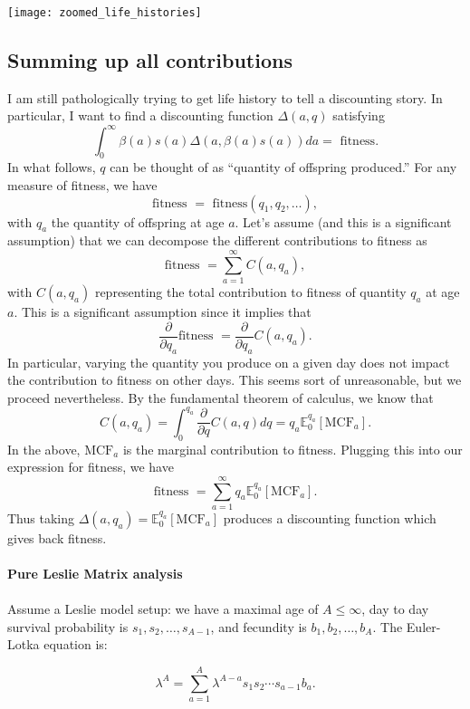 \texttt{[image: zoomed\_life\_histories]} \\

\subsection{Summing up all contributions}
I am still pathologically trying to get life history to tell a discounting story. In particular, I want to find a 
discounting function $\Delta(a,q)$ satisfying
$$ \int_0^\infty \beta(a) s(a) \Delta(a, \beta(a) s(a)) d a = \text{ fitness.} $$
In what follows, $q$ can be thought of as ``quantity of offspring produced.'' For any measure of fitness, we have
$$ \text{fitness } = \text{ fitness}(q_{1}, q_{2}, \ldots ),$$
with $q_a$ the quantity of offspring at age $a$. Let's assume (and this is a significant assumption) that we can decompose the different
contributions to fitness as 
$$ \text{fitness } = \sum\limits_{a = 1}^\infty C(a, q_a),$$
with $C(a, q_a)$ representing the total contribution to fitness of quantity $q_a$ at age $a$. This is a significant assumption since it
implies that
$$ \frac{\partial}{\partial q_{a}} \text{fitness } = \frac{\partial}{\partial q_{a}} C(a, q_a). $$
In particular, varying the quantity you produce on a given day does not impact the contribution to fitness on other days. This seems sort of
unreasonable, but we proceed nevertheless. By the fundamental theorem of calculus, we know that
$$ C(a, q_a) = \int_0^{q_a} \frac{\partial}{\partial q} C(a, q) d q = q_a \mathbb{E}_0^{q_a}\left[ \text{MCF}_a \right]. $$
In the above, $\text{MCF}_a$ is the marginal contribution to fitness. Plugging this into our expression for fitness, we have
$$ \text{fitness } = \sum\limits_{a = 1}^\infty q_a \mathbb{E}_0^{q_a}\left[ \text{MCF}_a \right].$$ 
Thus taking $\Delta(a, q_a) = \mathbb{E}_0^{q_a}\left[ \text{MCF}_a \right]$ produces a discounting function which gives back
fitness. \\\\

\textbf{Pure Leslie Matrix analysis} \\\\

Assume a Leslie model setup: we have a maximal age of $A \le \infty$, day to day survival probability is $s_1, s_2, \ldots, s_{A-1}$,
and fecundity is $b_1, b_2, \ldots, b_A$. The Euler-Lotka equation is:

$$ \lambda^A = \sum\limits_{a = 1}^A \lambda^{A-a}s_1 s_2 \cdots s_{a-1} b_a.$$

